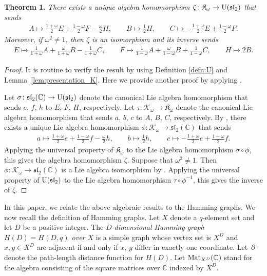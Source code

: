 \documentclass[pdftex]{sigma}%
\def\C{\mathbb C}
\def\K{\mathfrak K_\omega}
\def\Mat{{\rm Mat}}
\def\U{{\rm U}(\mathfrak{sl}_2)}
\numberwithin{equation}{section}
\newtheorem{Theorem}{Theorem}[section]
\begin{document}
\begin{Theorem}\label{thm:KtoU}
There exists a unique algebra homomorphism $\zeta\colon \K\to \U$ that sends
\begin{gather*}
A\mapsto \frac{1+\omega}{2} E+\frac{1-\omega}{2} F-\frac{\omega}{2}H,
\qquad
B\mapsto \frac{1}{2} H,
\qquad
C\mapsto -\frac{1+\omega}{2} E+\frac{1-\omega}{2} F.
\end{gather*}
Moreover, if $\omega^2\not=1$, then $\zeta$ is an isomorphism and its inverse sends
\begin{gather*}
E\mapsto \frac{1}{1+\omega}A+\frac{\omega}{1+\omega} B-\frac{1}{1+\omega}C,
\qquad
F\mapsto \frac{1}{1-\omega}A+\frac{\omega}{1-\omega} B+\frac{1}{1-\omega}C,
\qquad
H\mapsto 2 B.
\end{gather*}
\end{Theorem}

\begin{proof}
It is routine to verify the result by using Definition \ref{defn:U} and Lemma~\ref{lem:presentation_K}. Here we provide another proof by applying \cite[Lemmas~2.12 and~2.13]{K&sl2}.

Let $\sigma\colon \mathfrak{sl}_2(\C)\to \U$ denote the canonical Lie algebra homomorphism that sends $e$, $f$, $h$ to $E$, $F$, $H$, respectively.
 Let $\tau\colon \mathcal K_\omega\to \K$ denote the canonical Lie algebra homomorphism that sends $a$, $b$, $c$ to $A$, $B$, $C$, respectively.
By \cite[Lemma 2.12]{K&sl2}, there exists a unique Lie algebra homomorphism $\phi\colon \mathcal K_\omega \to \mathfrak{sl}_2(\C)$ that sends
\begin{gather*}
a \mapsto \frac{1+\omega}{2} e+\frac{1-\omega}{2} f-\frac{\omega}{2} h,
\qquad
b \mapsto \frac{1}{2} h,
\qquad
c \mapsto -\frac{1+\omega}{2} e+\frac{1-\omega}{2} f.
\end{gather*}
Applying the universal property of $\K$ to the Lie algebra homomorphism $
\sigma\circ \phi$, this gives the algebra homomorphism $\zeta$. Suppose that $\omega^2\not=1$. Then $\phi\colon \mathcal K_\omega \to \mathfrak{sl}_2(\C)$ is a Lie algebra isomorphism by \cite[Lemma 2.13]{K&sl2}.
Applying the universal property of $\U$ to the Lie algebra homomorphism $\tau\circ \phi^{-1}$, this gives the inverse of $\zeta$.
\end{proof}



In this paper, we relate the above algebraic results to the Hamming graphs. We now recall the definition of Hamming graphs.
Let $X$ denote a $q$-element set and let $D$ be a positive integer.
The {\it $D$-dimensional Hamming graph $H(D)=H(D,q)$ over $X$} is a simple graph whose vertex set is $X^D$ and $x,y\in X^D$ are adjacent if and only if $x$, $y$ differ in exactly one coordinate. Let~$\partial$ denote the path-length distance function for $H(D)$.
Let $\Mat_{X^D}(\C)$ stand for the algebra consisting of the square matrices over $\C$ indexed by $X^D$.
\end{document}
